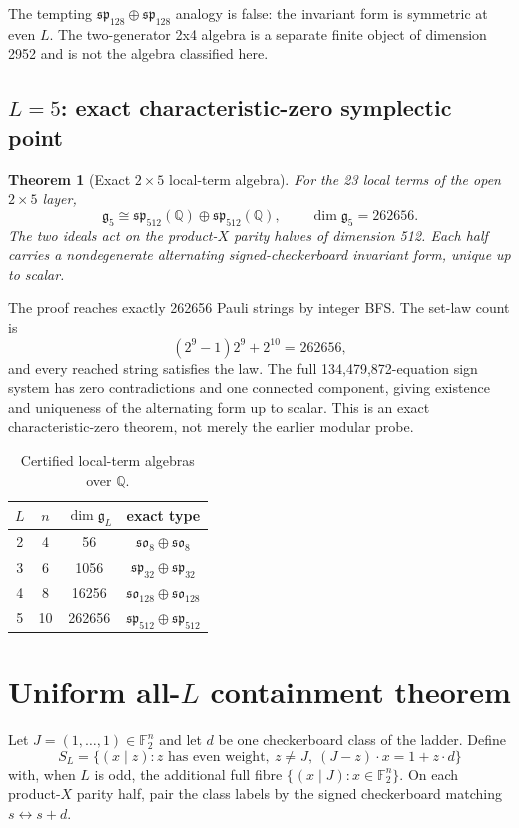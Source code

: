 \documentclass[11pt]{article}
\newtheorem{theorem}{Theorem}[section]
\newcommand{\Q}{\mathbb Q}
\newcommand{\F}{\mathbb F}
\newcommand{\g}{\mathfrak g}
\newcommand{\so}{\mathfrak{so}}
\renewcommand{\sp}{\mathfrak{sp}}
\begin{document}
The tempting $\sp_{128}\oplus\sp_{128}$ analogy is false: the invariant form is symmetric at even $L$.  The two-generator 2x4 algebra is a separate finite object of dimension 2952 and is not the algebra classified here.

\subsection{$L=5$: exact characteristic-zero symplectic point}
\begin{theorem}[Exact $2\times5$ local-term algebra]
For the 23 local terms of the open $2\times5$ layer,
\[
 \g_5\cong\sp_{512}(\Q)\oplus\sp_{512}(\Q),
 \qquad \dim\g_5=262656.
\]
The two ideals act on the product-$X$ parity halves of dimension 512.  Each half carries a nondegenerate alternating signed-checkerboard invariant form, unique up to scalar.
\end{theorem}

The proof reaches exactly 262656 Pauli strings by integer BFS.  The set-law count is
\[
 (2^9-1)2^9+2^{10}=262656,
\]
and every reached string satisfies the law.  The full 134,479,872-equation sign system has zero contradictions and one connected component, giving existence and uniqueness of the alternating form up to scalar.  This is an exact characteristic-zero theorem, not merely the earlier modular probe.

\begin{table}[h]
\centering
\begin{tabular}{c|c|c|c}
$L$ & $n$ & $\dim\g_L$ & exact type\\ \midrule
2 & 4 & 56 & $\so_8\oplus\so_8$\\
3 & 6 & 1056 & $\sp_{32}\oplus\sp_{32}$\\
4 & 8 & 16256 & $\so_{128}\oplus\so_{128}$\\
5 & 10 & 262656 & $\sp_{512}\oplus\sp_{512}$
\end{tabular}
\caption{Certified local-term algebras over $\Q$.}
\end{table}

\section{Uniform all-$L$ containment theorem}
Let $J=(1,\ldots,1)\in\F_2^n$ and let $d$ be one checkerboard class of the ladder.  Define
\[
 S_L=\{(x\mid z): z\text{ has even weight},\ z\neq J,\ (J-z)\cdot x=1+z\cdot d\}
\]
with, when $L$ is odd, the additional full fibre $\{(x\mid J):x\in\F_2^n\}$.  On each product-$X$ parity half, pair the class labels by the signed checkerboard matching $s\leftrightarrow s+d$.
\end{document}
